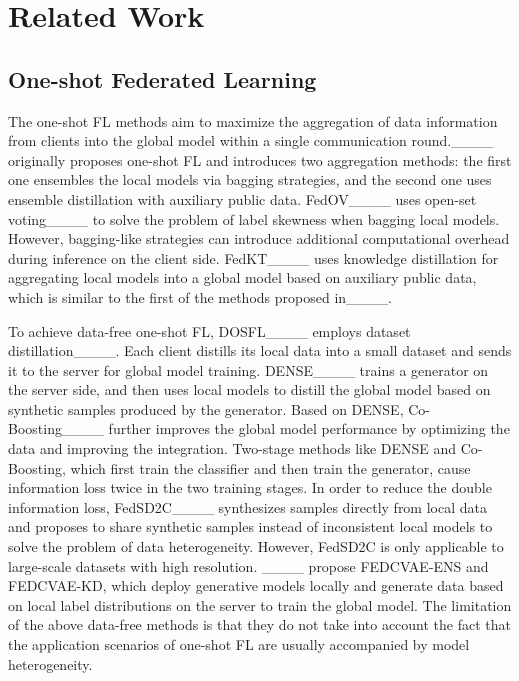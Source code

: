 \section{Related Work}


\subsection{One-shot Federated Learning}

The one-shot FL methods aim to maximize the aggregation of data information from clients into the global model within a single communication round.____ originally proposes one-shot FL and introduces two aggregation methods: the first one ensembles the local models via bagging strategies, and the second one uses ensemble distillation with auxiliary public data. FedOV____ uses open-set voting____ to solve the problem of label skewness when bagging local models. However, bagging-like strategies can introduce additional computational overhead during inference on the client side. FedKT____ uses knowledge distillation for aggregating local models into a global model based on auxiliary public data, which is similar to the first of the methods proposed in____. 

To achieve data-free one-shot FL, DOSFL____ employs dataset distillation____. Each client distills its local data into a small dataset and sends it to the server for global model training. DENSE____ trains a generator on the server side, and then uses local models to distill the global model based on synthetic samples produced by the generator. Based on DENSE, Co-Boosting____ further improves the global model performance by optimizing the data and improving the integration. Two-stage methods like DENSE and Co-Boosting, which first train the classifier and then train the generator, cause information loss twice in the two training stages. In order to reduce the double information loss, FedSD2C____ synthesizes samples directly from local data and proposes to share synthetic samples instead of inconsistent local models to solve the problem of data heterogeneity. However, FedSD2C is only applicable to large-scale datasets with high resolution. ____ propose FEDCVAE-ENS and FEDCVAE-KD, which deploy generative models locally and generate data based on local label distributions on the server to train the global model. The limitation of the above data-free methods is that they do not take into account the fact that the application scenarios of one-shot FL are usually accompanied by model heterogeneity.



